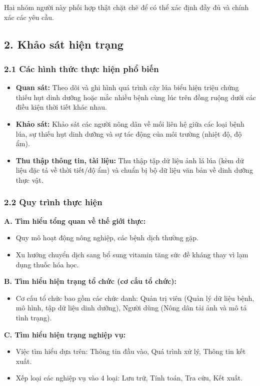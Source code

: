 \documentclass[12pt,a4paper]{article}
\begin{document}
Hai nhóm người này phối hợp thật chặt chẽ để có thể xác định đầy đủ và chính xác các yêu cầu.

\hrulefill

\subsection*{2. Khảo sát hiện trạng}
\subsubsection*{2.1 Các hình thức thực hiện phổ biến}
\begin{itemize}
    \item \textbf{Quan sát:} Theo dõi và ghi hình quá trình cây lúa biểu hiện triệu chứng thiếu hụt dinh dưỡng hoặc mắc nhiều bệnh cùng lúc trên đồng ruộng dưới các điều kiện thời tiết khác nhau.
    \item \textbf{Khảo sát:} Khảo sát các người nông dân về mối liên hệ giữa các loại bệnh lúa, sự thiếu hụt dinh dưỡng và sự tác động của môi trường (nhiệt độ, độ ẩm).
    \item \textbf{Thu thập thông tin, tài liệu:} Thu thập tập dữ liệu ảnh lá lúa (kèm dữ liệu đặc tả về thời tiết/độ ẩm) và chuẩn bị bộ dữ liệu văn bản về dinh dưỡng thực vật.
\end{itemize}

\subsubsection*{2.2 Quy trình thực hiện}
\textbf{A. Tìm hiểu tổng quan về thế giới thực:}
\begin{itemize}
    \item Quy mô hoạt động nông nghiệp, các bệnh dịch thường gặp.
    \item Xu hướng chuyển dịch sang bổ sung vitamin tăng sức đề kháng thay vì lạm dụng thuốc hóa học.
\end{itemize}

\textbf{B. Tìm hiểu hiện trạng tổ chức (cơ cấu tổ chức):}
\begin{itemize}
    \item Cơ cấu tổ chức bao gồm các chức danh: Quản trị viên (Quản lý dữ liệu bệnh, mô hình, tập dữ liệu dinh dưỡng), Người dùng (Nông dân tải ảnh và mô tả tình trạng).
\end{itemize}

\textbf{C. Tìm hiểu hiện trạng nghiệp vụ:}
\begin{itemize}
    \item Việc tìm hiểu dựa trên: Thông tin đầu vào, Quá trình xử lý, Thông tin kết xuất.
    \item Xếp loại các nghiệp vụ vào 4 loại: Lưu trữ, Tính toán, Tra cứu, Kết xuất.
\end{itemize}
\end{document}

